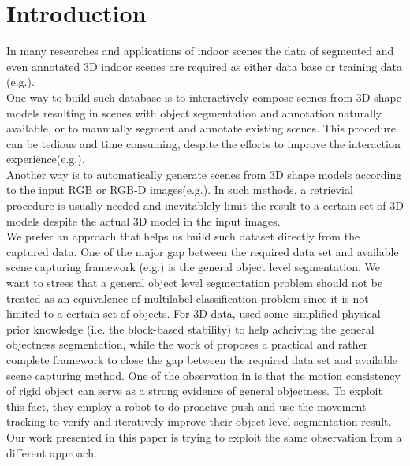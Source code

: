 \section{Introduction}
\label{sec:intro}
In many researches and applications of indoor scenes the data of segmented and even annotated 3D indoor scenes are required as either data base or training data (e.g.\cite{SearchClassify}\cite{SceneFromExample}\cite{Fisher:2012:ESO:2366145.2366154}\cite{Chen:2014:ASM:2661229.2661239}\cite{Fisher:ActivityCentricSceneSynthesis}).\\
One way to build such database is to interactively compose scenes from 3D shape models resulting in scenes with object segmentation and annotation naturally available, or to mannually segment and annotate existing scenes. This procedure can be tedious and time consuming, despite the efforts to improve the interaction experience(e.g.\cite{Merrell:2011:IFL:2010324.1964982}\cite{Xu:2013:SSC:2461912.2461968}).\\
Another way is to automatically generate scenes from 3D shape models according to the input RGB or RGB-D images(e.g.\cite{Liu2015Model}\cite{Chen:2014:ASM:2661229.2661239}). In such methods, a retrievial procedure is usually needed and inevitablely limit the result to a certain set of 3D models despite the actual 3D model in the input images.\\
We prefer an approach that helps us build such dataset directly from the captured data. One of the major gap between the required data set and available scene capturing framework (e.g.\cite{KinectFusion}) is the general object level segmentation. We want to stress that a general object level segmentation problem should not be treated as an equivalence of multilabel classification problem since it is not limited to a certain set of objects. For 3D data, \cite{3DReasoningfromBlockstoStability} used some simplified physical prior knowledge (i.e. the block-based stability) to help acheiving the general objectness segmentation, while the work of \cite{Xu:2015:ACS:2816795.2818075} proposes a practical and rather complete framework to close the gap between the required data set and available scene capturing method. One of the observation in \cite{Xu:2015:ACS:2816795.2818075} is that the motion consistency of rigid object can serve as a strong evidence of general objectness. To exploit this fact, they employ a robot to do proactive push and use the movement tracking to verify and iteratively improve their object level segmentation result. Our work presented in this paper is trying to exploit the same observation from a different approach.\\

